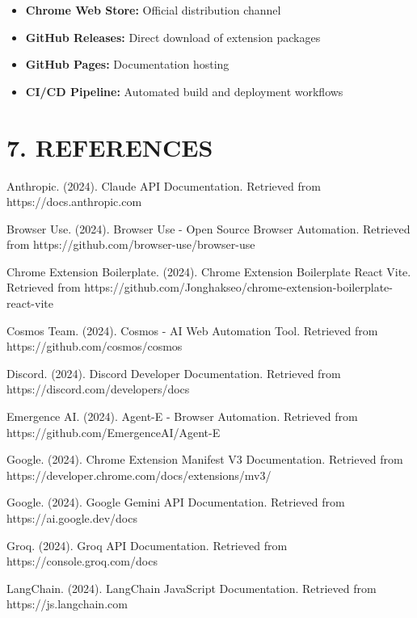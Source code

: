 \documentclass[12pt,a4paper]{article}
\begin{document}
\begin{itemize}
    \item \textbf{Chrome Web Store:} Official distribution channel
    \item \textbf{GitHub Releases:} Direct download of extension packages
    \item \textbf{GitHub Pages:} Documentation hosting
    \item \textbf{CI/CD Pipeline:} Automated build and deployment workflows
\end{itemize}

\vspace{0.5cm}

\section*{\textbf{7. REFERENCES}}

\setlength{\parindent}{0pt}
\setlength{\leftskip}{0.5in}
\setlength{\parskip}{0.3cm}

\noindent Anthropic. (2024). Claude API Documentation. Retrieved from https://docs.anthropic.com

\noindent Browser Use. (2024). Browser Use - Open Source Browser Automation. Retrieved from https://github.com/browser-use/browser-use

\noindent Chrome Extension Boilerplate. (2024). Chrome Extension Boilerplate React Vite. Retrieved from https://github.com/Jonghakseo/chrome-extension-boilerplate-react-vite

\noindent Cosmos Team. (2024). Cosmos - AI Web Automation Tool. Retrieved from https://github.com/cosmos/cosmos

\noindent Discord. (2024). Discord Developer Documentation. Retrieved from https://discord.com/developers/docs

\noindent Emergence AI. (2024). Agent-E - Browser Automation. Retrieved from https://github.com/EmergenceAI/Agent-E

\noindent Google. (2024). Chrome Extension Manifest V3 Documentation. Retrieved from https://developer.chrome.com/docs/extensions/mv3/

\noindent Google. (2024). Google Gemini API Documentation. Retrieved from https://ai.google.dev/docs

\noindent Groq. (2024). Groq API Documentation. Retrieved from https://console.groq.com/docs

\noindent LangChain. (2024). LangChain JavaScript Documentation. Retrieved from https://js.langchain.com
\end{document}
